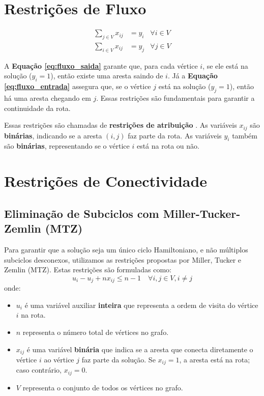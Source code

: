\documentclass[12pt, a4paper]{report}
\begin{document}
\section{Restrições de Fluxo}
\begin{align}
    \sum_{j \in V} x_{ij} &= y_i & \forall i \in V \label{eq:fluxo_saida} \\
    \sum_{i \in V} x_{ij} &= y_j & \forall j \in V \label{eq:fluxo_entrada}
\end{align}

A \textbf{Equação \eqref{eq:fluxo_saida}} garante que, para cada vértice $i$, se ele está na solução ($y_i=1$), então existe uma aresta saindo de $i$. Já a \textbf{Equação \eqref{eq:fluxo_entrada}} assegura que, se o vértice $j$ está na solução ($y_j=1$), então há uma aresta chegando em $j$. Essas restrições são fundamentais para garantir a continuidade da rota.

Essas restrições são chamadas de \textbf{restrições de atribuição} \cite{lopesfilho2019,carvalho2022}. As variáveis $x_{ij}$ são \textbf{binárias}, indicando se a aresta $(i,j)$ faz parte da rota. As variáveis $y_i$ também são \textbf{binárias}, representando se o vértice $i$ está na rota ou não.

\section{Restrições de Conectividade}

\subsection*{Eliminação de Subciclos com Miller-Tucker-Zemlin (MTZ)}
Para garantir que a solução seja um único ciclo Hamiltoniano, e não múltiplos subciclos desconexos, utilizamos as restrições propostas por Miller, Tucker e Zemlin (MTZ). Estas restrições são formuladas como:
\begin{equation}
    u_i - u_j + n x_{ij} \leq n-1 \quad \forall i,j \in V, i \neq j
\end{equation}
onde:
\begin{itemize}
    \item $u_i$ é uma variável auxiliar \textbf{inteira} que representa a ordem de visita do vértice $i$ na rota.
    \item $n$ representa o número total de vértices no grafo.
     \item $x_{ij}$ é uma variável \textbf{binária} que indica se a aresta que conecta diretamente o vértice $i$ ao vértice $j$ faz parte da solução. Se $x_{ij} = 1$, a aresta está na rota; caso contrário, $x_{ij} = 0$.
    \item $V$ representa o conjunto de todos os vértices no grafo.
\end{itemize}
\end{document}
